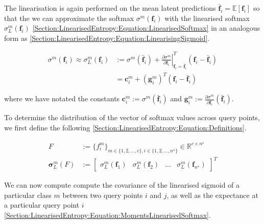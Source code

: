 \documentclass{article}
\renewcommand{\vec}[1]{\boldsymbol{#1}}
\begin{document}
			The linearisation is again performed on the mean latent predictions $\bar{\vec{f}}_{i} = \mathbb{E}[\vec{f}_{i}]$ so that the we can approximate the softmax $\sigma^{m}(\vec{f}_{i})$ with the linearised softmax $\sigma^{m}_{L}(\vec{f}_{i})$ \eqref{Section:LinearisedEntropy:Equation:LinearisedSoftmax} in an analogous form as \eqref{Section:LinearisedEntropy:Equation:LinearisingSigmoid}.
			
			\begin{equation}
				\begin{aligned}
					\sigma^{m}(\vec{f}_{i}) \approx \sigma^{m}_{L}(\vec{f}_{i}) & := \sigma^{m}(\bar{\vec{f}}_{i}) + \left. \frac{\partial \sigma^{m}}{\partial \vec{f}_{i}} \right|^{T}_{\vec{f}_{i} = \bar{\vec{f}}_{i}} (\vec{f}_{i} - \bar{\vec{f}}_{i}) \\
					& = \vec{c}^{m}_{i} + (\vec{g}^{m}_{i})^{T} (\vec{f}_{i} - \bar{\vec{f}}_{i})
				\end{aligned}
			\label{Section:LinearisedEntropy:Equation:LinearisedSoftmax}
			\end{equation}
			
			where we have notated the constants $\vec{c}^{m}_{i} := \sigma^{m}(\bar{\vec{f}}_{i})$ and $\vec{g}^{m}_{i} := \frac{\partial \sigma^{m}}{\partial \vec{f}_{i}}(\bar{\vec{f}}_{i})$.
			
			To determine the distribution of the vector of softmax values across query points, we first define the following \eqref{Section:LinearisedEntropy:Equation:Definitions}.
			
			\begin{equation}
				\begin{aligned}
					F &:= \{f^{m}_{i}\}_{m \in \{1, 2, \dots, c\}, i \in \{1, 2, \dots, n^{\star}\}} \in \mathbb{R}^{c \times n^{\star}} \\
					\vec{\sigma}^{m}_{L}(F) &:= \begin{bmatrix} \sigma^{m}_{L}(\vec{f}_{1}) & \sigma^{m}_{L}(\vec{f}_{2}) & \dots & \sigma^{m}_{L}(\vec{f}_{n^{\star}}) \end{bmatrix}^{T}
				\end{aligned}
			\label{Section:LinearisedEntropy:Equation:Definitions}
			\end{equation}
						
			We can now compute compute the covariance of the linearised sigmoid of a particular class $m$ between two query points $i$ and $j$, as well as the expectance at a particular query point $i$ \eqref{Section:LinearisedEntropy:Equation:MomentsLinearisedSoftmax}.
			
\end{document}

